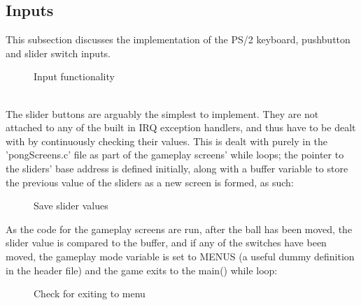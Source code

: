 \documentclass[a4paper,12pt]{article}
\begin{document}
\subsection{Inputs}
\begin{flushleft}
This subsection discusses the implementation of the PS/2 keyboard, pushbutton and slider switch inputs.

\begin{figure}[H]
	\centering
	\caption{Input functionality}
\end{figure}
\- \\
The slider buttons are arguably the simplest to implement. They are not attached to any of the built in IRQ exception handlers, and thus have to be dealt with by continuously checking their values. This is dealt with purely in the 'pongScreens.c' file as part of the gameplay screens' while loops; the pointer to the sliders' base address is defined initially, along with a buffer variable to store the previous value of the sliders as a new screen is formed, as such:
\begin{figure}[H]
	
	\caption{Save slider values}
\end{figure}
As the code for the gameplay screens are run, after the ball has been moved, the slider value is compared to the buffer, and if any of the switches have been moved, the gameplay mode variable is set to MENUS (a useful dummy definition in the header file) and the game exits to the main() while loop:
\begin{figure}[H]
	
	\caption{Check for exiting to menu}
\end{figure}
\- \\

\end{flushleft}
\end{document}
